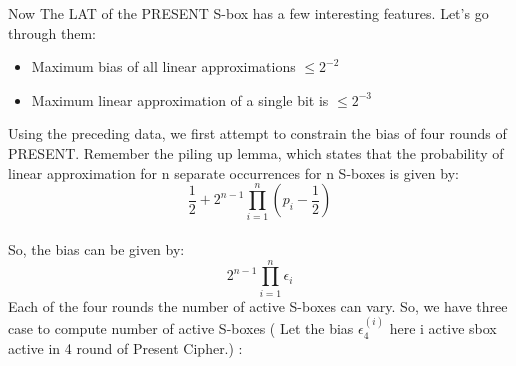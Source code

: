 \documentclass[journal=tosc,preprint]{iacrtrans}
\begin{document}
Now The LAT of the PRESENT S-box has a few interesting features. Let's go through them:
\begin{itemize}
	\item Maximum bias of all linear approximations $ \le 2^{-2}$
	\item Maximum linear approximation of a single bit is $\le 2^{-3}$
\end{itemize}
   Using the preceding data, we first attempt to constrain the bias of four rounds of PRESENT. Remember the piling up lemma, which states that the probability of linear approximation for n separate occurrences for n S-boxes is given by:
\begin{equation*}
\frac{1}{2} + 2^{n-1} \prod_{i=1}^{n} \left( p_i  - \frac{1}{2} \right)
\end{equation*}\\
So, the bias can be given by:
\begin{equation*}
2^{n-1}\prod_{i=1}^{n} \epsilon_i
\end{equation*}
Each of the four rounds the number of active S-boxes can vary. So, we have three case to compute number of active S-boxes ( Let the bias $\epsilon_4^{(i)}$ here i active sbox active in 4 round of Present Cipher.) : 
\end{document}

